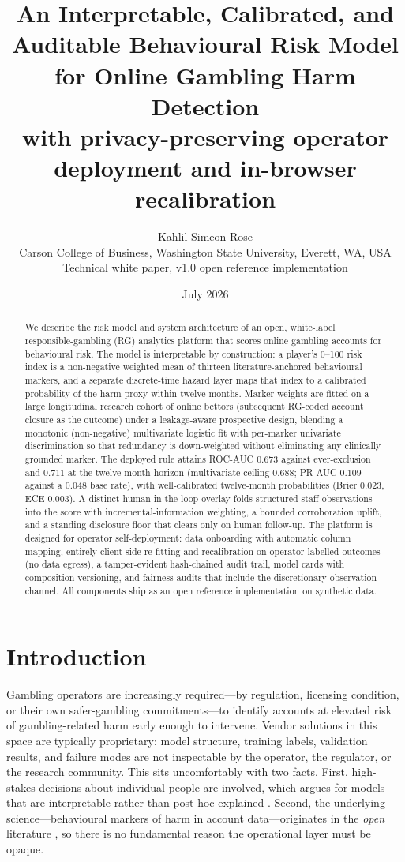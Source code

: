 \documentclass[11pt]{article}
\title{\textbf{An Interpretable, Calibrated, and Auditable
Behavioural Risk Model for Online Gambling Harm Detection}\\[4pt]
\large with privacy-preserving operator deployment and in-browser recalibration}
\author{Kahlil Simeon-Rose\\
\small Carson College of Business, Washington State University, Everett, WA, USA\\
\small Technical white paper, v1.0 \quad\textbullet\quad open reference implementation}
\date{July 2026}
\begin{document}
\maketitle

\begin{abstract}
\noindent
We describe the risk model and system architecture of an
open, white-label responsible-gambling (RG) analytics platform that scores online
gambling accounts for behavioural risk. The model is interpretable by construction: a
player's 0--100 risk index is a non-negative weighted mean of thirteen
literature-anchored behavioural markers, and a separate discrete-time hazard layer
maps that index to a calibrated probability of the harm proxy within twelve months. Marker weights are fitted on a large
longitudinal research cohort of online bettors (subsequent RG-coded account closure as
the outcome) under a leakage-aware prospective design, blending a monotonic
(non-negative) multivariate logistic fit with per-marker univariate discrimination so
that redundancy is down-weighted without eliminating any clinically grounded marker.
The deployed rule attains ROC-AUC $0.673$ against ever-exclusion and $0.711$ at the
twelve-month horizon (multivariate ceiling $0.688$; PR-AUC $0.109$ against a $0.048$
base rate), with well-calibrated twelve-month probabilities (Brier $0.023$, ECE $0.003$).
A distinct human-in-the-loop overlay folds structured staff observations into the score
with incremental-information weighting, a bounded corroboration uplift, and a standing
disclosure floor that clears only on human follow-up. The platform is designed for
operator self-deployment: data onboarding with automatic column mapping, entirely
client-side re-fitting and recalibration on operator-labelled outcomes (no data
egress), a tamper-evident hash-chained audit trail, model cards with composition
versioning, and fairness audits that include the discretionary observation channel.
All components ship as an open reference implementation on synthetic data.
\end{abstract}

\section{Introduction}\label{sec:intro}

Gambling operators are increasingly required---by regulation, licensing condition, or
their own safer-gambling commitments---to identify accounts at elevated risk of
gambling-related harm early enough to intervene. Vendor solutions in this space are
typically proprietary: model structure, training labels, validation results, and
failure modes are not inspectable by the operator, the regulator, or the research
community. This sits uncomfortably with two facts. First, high-stakes decisions about
individual people are involved, which argues for models that are interpretable rather
than post-hoc explained \citep{rudin2019}. Second, the underlying science---behavioural
markers of harm in account data---originates in the \emph{open} literature
\citep{labrie2007,braverman2012,braverman2013,haeusler2016}, so there is no fundamental
reason the operational layer must be opaque.
\end{document}
